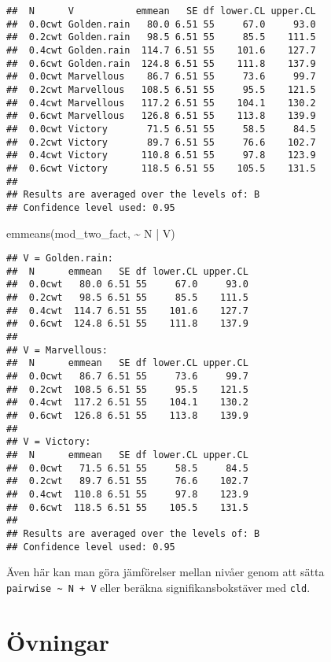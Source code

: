 \documentclass[
]{book}
\newenvironment{Shaded}{\begin{snugshade}}{\end{snugshade}}
\newcommand{\FunctionTok}[1]{\textcolor[rgb]{0.00,0.00,0.00}{#1}}
\newcommand{\NormalTok}[1]{#1}
\newcommand{\SpecialCharTok}[1]{\textcolor[rgb]{0.00,0.00,0.00}{#1}}
\theoremstyle{definition}
\theoremstyle{definition}
\theoremstyle{definition}
\theoremstyle{definition}
\theoremstyle{remark}
\begin{document}
\begin{verbatim}
##  N      V           emmean   SE df lower.CL upper.CL
##  0.0cwt Golden.rain   80.0 6.51 55     67.0     93.0
##  0.2cwt Golden.rain   98.5 6.51 55     85.5    111.5
##  0.4cwt Golden.rain  114.7 6.51 55    101.6    127.7
##  0.6cwt Golden.rain  124.8 6.51 55    111.8    137.9
##  0.0cwt Marvellous    86.7 6.51 55     73.6     99.7
##  0.2cwt Marvellous   108.5 6.51 55     95.5    121.5
##  0.4cwt Marvellous   117.2 6.51 55    104.1    130.2
##  0.6cwt Marvellous   126.8 6.51 55    113.8    139.9
##  0.0cwt Victory       71.5 6.51 55     58.5     84.5
##  0.2cwt Victory       89.7 6.51 55     76.6    102.7
##  0.4cwt Victory      110.8 6.51 55     97.8    123.9
##  0.6cwt Victory      118.5 6.51 55    105.5    131.5
## 
## Results are averaged over the levels of: B 
## Confidence level used: 0.95
\end{verbatim}

\begin{Shaded}
\begin{Highlighting}[]
\FunctionTok{emmeans}\NormalTok{(mod\_two\_fact, }\SpecialCharTok{\textasciitilde{}}\NormalTok{ N }\SpecialCharTok{|}\NormalTok{ V)}
\end{Highlighting}
\end{Shaded}

\begin{verbatim}
## V = Golden.rain:
##  N      emmean   SE df lower.CL upper.CL
##  0.0cwt   80.0 6.51 55     67.0     93.0
##  0.2cwt   98.5 6.51 55     85.5    111.5
##  0.4cwt  114.7 6.51 55    101.6    127.7
##  0.6cwt  124.8 6.51 55    111.8    137.9
## 
## V = Marvellous:
##  N      emmean   SE df lower.CL upper.CL
##  0.0cwt   86.7 6.51 55     73.6     99.7
##  0.2cwt  108.5 6.51 55     95.5    121.5
##  0.4cwt  117.2 6.51 55    104.1    130.2
##  0.6cwt  126.8 6.51 55    113.8    139.9
## 
## V = Victory:
##  N      emmean   SE df lower.CL upper.CL
##  0.0cwt   71.5 6.51 55     58.5     84.5
##  0.2cwt   89.7 6.51 55     76.6    102.7
##  0.4cwt  110.8 6.51 55     97.8    123.9
##  0.6cwt  118.5 6.51 55    105.5    131.5
## 
## Results are averaged over the levels of: B 
## Confidence level used: 0.95
\end{verbatim}

Även här kan man göra jämförelser mellan nivåer genom att sätta \texttt{pairwise\ \textasciitilde{}\ N\ +\ V} eller beräkna signifikansbokstäver med \texttt{cld}.

\hypertarget{uxf6vningar-4}{%
\section{Övningar}\label{uxf6vningar-4}}
\end{document}
